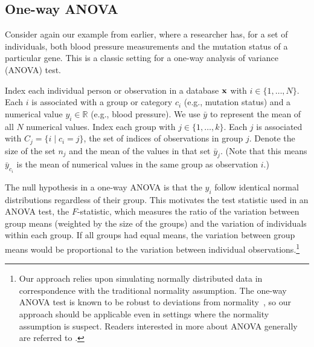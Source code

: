 \subsection{One-way ANOVA}

Consider again our example from earlier, where a researcher has, for a set of individuals, both blood pressure measurements and the mutation status of a particular gene.  This is a classic setting for a one-way analysis of variance (ANOVA) test.

Index each individual person or observation in a database $\mathbf{x}$ with $i \in \{1, \ldots, N\}$. Each $i$ is associated with a group or category $c_i$ (e.g., mutation status) and a numerical value $y_i \in \mathbb{R}$ (e.g., blood pressure).  We use $\bar{y}$ to represent the mean of all $N$ numerical values. Index each group with $j \in \{1, \ldots, k\}$. Each $j$ is associated with $C_j = \{i \mid c_i=j\}$, the set of indices of observations in group $j$. Denote the size of the set $n_j$ and the mean of the values in that set $\bar{y}_j$.  (Note that this means $\bar{y}_{c_i}$ is the mean of numerical values in the same group as observation $i$.)

The null hypothesis in a one-way ANOVA is that the $y_i$ follow identical normal distributions regardless of their group. This motivates the test statistic used in an ANOVA test, the $F$-statistic, which measures the ratio of the variation between group means (weighted by the size of the groups) and the variation of individuals within each group. If all groups had equal means, the variation between group means would be proportional to the variation between individual observations.\footnote{Our approach relies upon simulating normally distributed data in correspondence with the traditional normality assumption. The one-way ANOVA test is known to be robust to deviations from normality~\cite{schmider2010}, so our approach should be applicable even in settings where the normality assumption is suspect. Readers interested in more about ANOVA generally are referred to \cite{cox1974theoretical}.}

